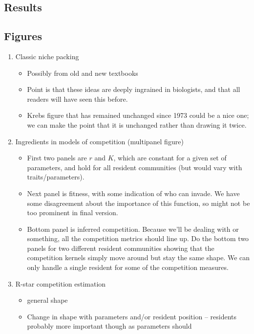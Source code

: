 \documentclass[a4paper,11pt]{article}
\begin{document}
\begin{itemize}
\clearpage

\section{Results}

\subsection{Figures}

\begin{enumerate}
\item Classic niche packing
  \begin{itemize}
  \item Possibly from old and new textbooks
  \item Point is that these ideas are deeply ingrained in biologists,
    and that all readers will have seen this before.
  \item Krebs figure that has remained unchanged since 1973 could be a
    nice one; we can make the point that it is unchanged rather than
    drawing it twice.
  \end{itemize}
\item Ingredients in models of competition (multipanel figure)
  \begin{itemize}
  \item First two panels are $r$ and $K$, which are constant for a
    given set of parameters, and hold for all resident communities
    (but would vary with traits/parameters).
  \item Next panel is fitness, with some indication of who can
    invade.  We have some disagreement about the importance of this
    function, so might not be too prominent in final version.
  \item Bottom panel is inferred competition.  Because we'll be
    dealing with \citet{Dieckmann-1999} or something, all the
    competition metrics should line up.  Do the bottom two panels for
    two different resident communities showing that the competition
    kernels simply move around but stay the same shape.  We can only
    handle a single resident for some of the competition measures.
  \end{itemize}
\item R-star competition estimation
  \begin{itemize}
  \item general shape
  \item Change in shape with parameters and/or resident position --
    residents probably more important though as parameters should

\end{itemize}
\end{enumerate}
\end{itemize}
\end{document}
